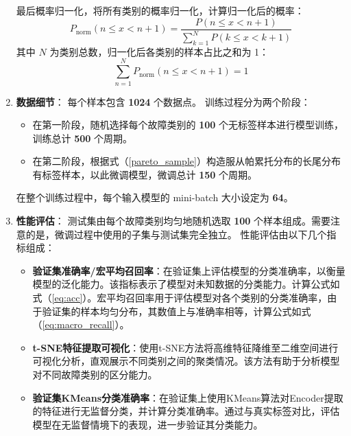 \documentclass[master]{thesis-uestc}
\begin{document}
\begin{enumerate}[label={(\arabic*)}]
    最后概率归一化，将所有类别的概率归一化，计算归一化后的概率：
    \begin{equation}
    P_{\text{norm}}(n \leq x < n+1) = \frac{P(n \leq x < n+1)}{\sum_{k=1}^N P(k \leq x < k+1)}
    \label{pareto_sample}
    \end{equation}
    其中 $N$ 为类别总数，归一化后各类别的样本占比之和为 1：
    \begin{equation}
    \sum_{n=1}^N P_{\text{norm}}(n \leq x < n+1) = 1
    \end{equation}
    \item \textbf{数据细节}：
      每个样本包含 \textbf{1024} 个数据点。
      训练过程分为两个阶段：
      \begin{itemize}
          \item 在第一阶段，随机选择每个故障类别的 \textbf{100} 个无标签样本进行模型训练，训练总计 \textbf{500} 个周期。
          \item 在第二阶段，根据式（\ref{pareto_sample}）构造服从帕累托分布的长尾分布有标签样本，以此微调模型，微调总计 \textbf{150} 个周期。
      \end{itemize}
      在整个训练过程中，每个输入模型的 mini-batch 大小设定为 \textbf{64}。
      
      \item \textbf{性能评估}：  
      测试集由每个故障类别均匀地随机选取 \textbf{100} 个样本组成。需要注意的是，微调过程中使用的子集与测试集完全独立。  
      性能评估由以下几个指标组成：

      \begin{itemize}
          \item \textbf{验证集准确率/宏平均召回率}：在验证集上评估模型的分类准确率，以衡量模型的泛化能力。该指标表示了模型对未知数据的分类能力。计算公式如式（\ref{eq:acc}）。宏平均召回率用于评估模型对各个类别的分类准确率，由于验证集的样本均匀分布，其数值上与准确率相等，计算公式如式（\ref{eq:macro_recall}）。
          
          \item \textbf{t-SNE特征提取可视化}：使用t-SNE方法将高维特征降维至二维空间进行可视化分析，直观展示不同类别之间的聚类情况。该方法有助于分析模型对不同故障类别的区分能力。

          \item \textbf{验证集KMeans分类准确率}：在验证集上使用KMeans算法对Encoder提取的特征进行无监督分类，并计算分类准确率。通过与真实标签对比，评估模型在无监督情境下的表现，进一步验证其分类能力。
      \end{itemize}      
\end{enumerate}
\end{document}
